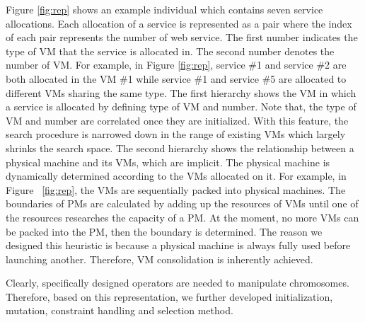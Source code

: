 Figure \ref{fig:rep} shows an example individual which contains seven service allocations. Each allocation of a service is represented as a pair where the index of each pair represents the number of web service. The first number indicates the type of VM that the service is allocated in. The second number denotes the number of VM.  For example, in Figure \ref{fig:rep}, service \#1 and service \#2 are both allocated in the VM \#1 while service \#1 and service \#5 are allocated to different VMs sharing the same type.
The first hierarchy shows the VM in which a service is allocated by defining type of VM and number. 
Note that, the type of VM and number are correlated once they are initialized. 
With this feature, the search procedure is narrowed down in the range of existing VMs which largely shrinks the search space.
The second hierarchy shows the relationship between a physical machine and its VMs, which are implicit. The physical machine is dynamically determined according to the VMs allocated on it. 
For example, in Figure ~\ref{fig:rep}, the VMs are 
sequentially packed into physical machines. The boundaries of PMs are calculated by adding up the resources of VMs until one of the resources researches the capacity of a PM. At the moment, no more VMs can be packed into the PM, then the boundary is determined.
The reason we designed this heuristic is because a physical machine is always fully used before launching another. Therefore, VM consolidation is inherently achieved.

Clearly, specifically designed operators are needed to manipulate chromosomes. Therefore, based on this representation, we further developed initialization, mutation, constraint handling and selection method.

